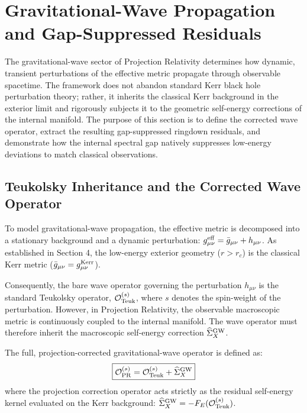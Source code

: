 \documentclass[11pt]{article}
\begin{document}
\section{Gravitational-Wave Propagation and Gap-Suppressed Residuals}
\label{sec:gravitational_wave_propagation}

The gravitational-wave sector of Projection Relativity determines how dynamic, transient perturbations of the effective metric propagate through observable spacetime. The framework does not abandon standard Kerr black hole perturbation theory; rather, it inherits the classical Kerr background in the exterior limit and rigorously subjects it to the geometric self-energy corrections of the internal manifold. The purpose of this section is to define the corrected wave operator, extract the resulting gap-suppressed ringdown residuals, and demonstrate how the internal spectral gap natively suppresses low-energy deviations to match classical observations.

\subsection{Teukolsky Inheritance and the Corrected Wave Operator}
\label{sec:teukolsky_inheritance}

To model gravitational-wave propagation, the effective metric is decomposed into a stationary background and a dynamic perturbation: $g_{\mu\nu}^{\rm eff} = \bar{g}_{\mu\nu} + h_{\mu\nu}$. As established in Section 4, the low-energy exterior geometry ($r > r_c$) is the classical Kerr metric \cite{kerr1963} ($\bar{g}_{\mu\nu} = g_{\mu\nu}^{\rm Kerr}$). 

Consequently, the bare wave operator governing the perturbation $h_{\mu\nu}$ is the standard Teukolsky \cite{teukolsky1973} operator, $\mathcal{O}_{\rm Teuk}^{(s)}$, where $s$ denotes the spin-weight of the perturbation. However, in Projection Relativity, the observable macroscopic metric is continuously coupled to the internal manifold. The wave operator must therefore inherit the macroscopic self-energy correction $\widehat{\Sigma}_X^{\rm GW}$.

The full, projection-corrected gravitational-wave operator is defined as:
\begin{equation}
\boxed{ \mathcal{O}_{\rm PR}^{(s)} = \mathcal{O}_{\rm Teuk}^{(s)} + \widehat{\Sigma}_X^{\rm GW} }
\end{equation}
where the projection correction operator acts strictly as the residual self-energy kernel evaluated on the Kerr background: $\widehat{\Sigma}_X^{\rm GW} = -F_E(\mathcal{O}_{\rm Teuk}^{(s)})$. 
\end{document}
